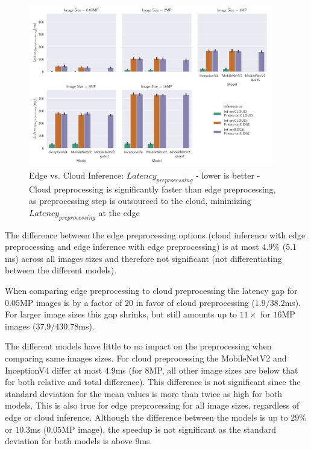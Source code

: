 \begin{figure}[!htb]
\centering
\includegraphics[width=0.95\textwidth]{./Bilder/single_plots/edge_vs_cloud_plots/Edge_vs_Cloud_Inference_Preprocessing_Latencies.pdf}
\caption[Edge vs. Cloud Inference:  $Latency_{preprocessing}$ - lower is better]{Edge vs. Cloud Inference:  $Latency_{preprocessing}$ - lower is better - Cloud preprocessing is significantly faster than edge preprocessing, as preprocessing step is outsourced to the cloud, minimizing $Latency_{preprocessing}$ at the edge}
\label{fig:EdgeVsCloudPreproLat}
\end{figure}

The difference between the edge preprocessing options (cloud inference with edge preprocessing and edge inference with edge preprocessing) is at most $4.9\%$ ($5.1$ms) across all images sizes and therefore not significant (not differentiating between the different models).

When comparing edge preprocessing to cloud preprocessing the latency gap for $0.05$MP images is by a factor of $20$ in favor of cloud preprocessing ($1.9/38.2$ms). For larger image sizes this gap shrinks, but still amounts up to  $11\times$ for $16$MP images ($37.9/430.78$ms).

The different models have little to no impact on the preprocessing when comparing same images sizes.
For cloud preprocessing the MobileNetV2 and InceptionV4 differ at most $4.9$ms (for $8$MP, all other image sizes are below that for both relative and total difference). This difference is not significant since the standard deviation for the mean values is more than twice as high for both models.
This is also true for edge preprocessing for all image sizes, regardless of edge or cloud inference.
Although the difference between the models is up to $29\%$ or $10.3$ms ($0.05$MP image), the speedup is not significant as the standard deviation for both models is above $9$ms.

